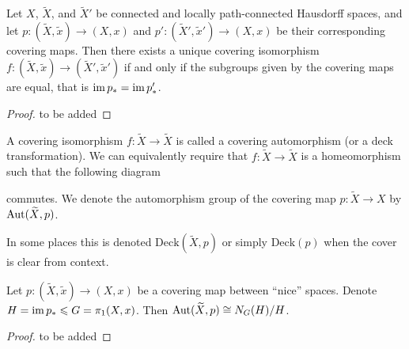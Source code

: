 \documentclass[11pt,a4paper]{article}
\begin{document}
\begin{proposition}
  Let $X$, $\widetilde X$,
  and $\widetilde X'$ be connected and locally path-connected Hausdorff spaces,
  and let $p \colon (\widetilde X, \tilde x) \to (X, x)$ and
  $p' \colon (\widetilde X', \tilde x') \to (X, x)$ be their corresponding
  covering maps.
  Then there exists a unique covering isomorphism
  $f \colon (\widetilde X, \tilde x) \to (\widetilde X', \tilde x')$
  if and only if the subgroups given by the covering maps are equal,
  that is
  $\operatorname{im} p_* = \operatorname{im} p'_*$.
\end{proposition}
\begin{proof}
  to be added
\end{proof}

\begin{definition}
  A covering isomorphism $f \colon \widetilde X \to \widetilde X$
  is called a covering automorphism (or a deck transformation).
  We can equivalently require that $f \colon \widetilde X \to \widetilde X$
  is a homeomorphism such that the following diagram
    \begin{center}
  \end{center}
  commutes.
  We denote the automorphism group of the covering map
  $p \colon \widetilde X \to X$ by $\operatorname{Aut}(\widetilde X, p)$.
\end{definition}
\begin{remark}
  In some places this is denoted $\mathrm{Deck}(\widetilde X,p)$ or
  simply $\mathrm{Deck}(p)$ when the cover is clear from context.
\end{remark}

\begin{proposition}
  Let $p \colon (\widetilde X, \tilde x) \to (X, x)$ be a covering map between
  ``nice'' spaces.
  Denote $H = \operatorname{im} p_* \leqslant G = \pi_1(X,x)$.
  Then $\operatorname{Aut}(\widetilde X, p) \cong N_G(H) / H$.
\end{proposition}
\begin{proof}
  to be added
\end{proof}
\end{document}
